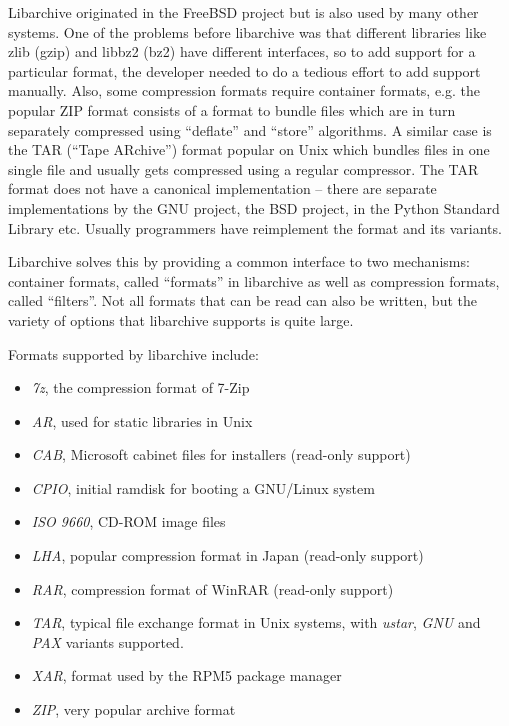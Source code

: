 \documentclass[parskip=half]{scrreprt}
\begin{document}
Libarchive originated in the FreeBSD project but is also used by many other
systems. One of the problems before libarchive was that different libraries
like zlib (gzip) and libbz2 (bz2) have different interfaces, so to add support
for a particular format, the developer needed to do a tedious effort to add
support manually. Also, some compression formats require container formats,
e.g. the popular ZIP format consists of a format to bundle files which are in
turn separately compressed using \enquote{deflate} and \enquote{store}
algorithms. A similar case is the TAR (\enquote{Tape ARchive}) format popular
on Unix which bundles files in one single file and usually gets compressed
using a regular compressor. The TAR format does not have a canonical
implementation -- there are separate implementations by the GNU project, the
BSD project, in the Python Standard Library etc. Usually programmers have
reimplement the format and its variants.

Libarchive solves this by providing a common interface to two mechanisms:
container formats, called \enquote{formats} in libarchive as well as
compression formats, called \enquote{filters}. Not all formats that can be read
can also be written, but the variety of options that libarchive supports is
quite large.

Formats supported by libarchive include:

\begin{itemize}
  \item \emph{7z}, the compression format of 7-Zip
  \item \emph{AR}, used for static libraries in Unix
  \item \emph{CAB}, Microsoft cabinet files for installers (read-only support)
  \item \emph{CPIO}, initial ramdisk for booting a GNU/Linux system
  \item \emph{ISO 9660}, CD-ROM image files
  \item \emph{LHA}, popular compression format in Japan (read-only support)
  \item \emph{RAR}, compression format of WinRAR (read-only support)
  \item \emph{TAR}, typical file exchange format in Unix systems, with
    \emph{ustar}, \emph{GNU} and \emph{PAX} variants supported.
  \item \emph{XAR}, format used by the RPM5 package manager
  \item \emph{ZIP}, very popular archive format
\end{itemize}
\end{document}
